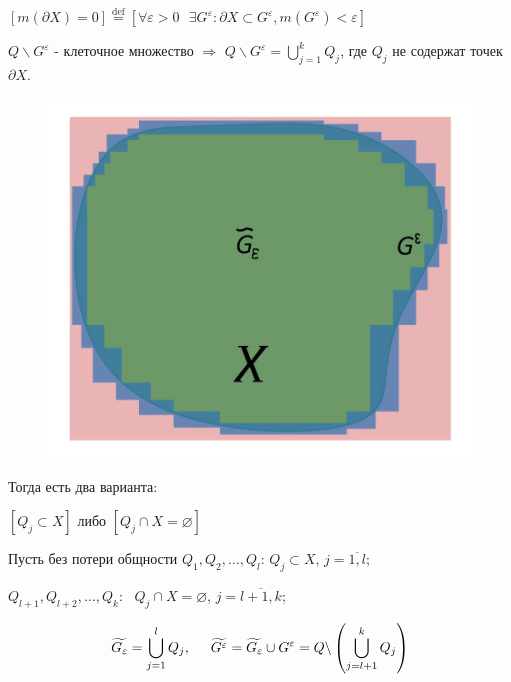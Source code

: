 \documentclass[a4paper,12pt]{article} %
\begin{document}
	$\left[m(\partial X) = 0\right] \stackrel{\text{def}}{=} \left[\forall \varepsilon > 0 \text{ } \exists G^{\varepsilon}: \partial X \subset G^{\varepsilon}, m(G^{\varepsilon}) < \varepsilon\right]$ 
	
	\vspace{2mm}
	
	$Q \backslash G^{\varepsilon}$ - клеточное множество $\Rightarrow$ $ Q \backslash G^{\varepsilon} = \bigcup\limits_{j = 1}^k Q_j$, \hspace{7mm} где $Q_j$ не содержат точек $\partial X$.
	
	\begin{figure}
		\includegraphics[scale=0.25]{Q(Клет).jpg}
	\end{figure}
	
	Тогда есть два варианта:
	
	$\left[Q_j \subset X\right]$ либо $\left[Q_j \cap X = \varnothing\right]$
	
	\vspace{2mm}
	
	Пусть без потери общности $Q_1, Q_2, \ldots, Q_l$: $\text{} Q_j \subset X$, $j = \overline{1,l}$;
	
	$Q_{l+1}, Q_{l+2}, \ldots, Q_k:\text{ } Q_j \cap X = \varnothing$, $j = \overline{l+1,k}$;
	
	
	\begin{equation*}
		\widetilde{G_{\varepsilon}} = \bigcup\limits_{j = 1}^l Q_j, \hspace{5mm} \widetilde{G^{\varepsilon}} = \widetilde{G_{\varepsilon}} \cup G^{\varepsilon} = Q \backslash \left(\bigcup\limits_{j = l + 1}^k Q_j\right)
	\end{equation*}
	
\end{document}
